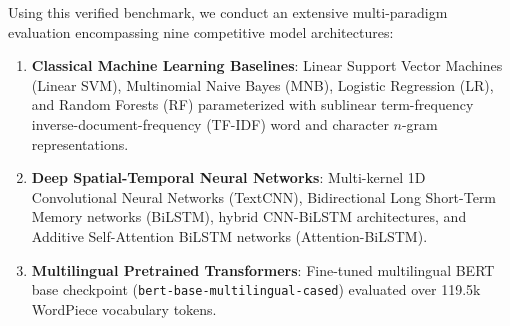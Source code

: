 \documentclass[11pt,a4paper]{article}
\begin{document}
Using this verified benchmark, we conduct an extensive multi-paradigm evaluation encompassing nine competitive model architectures:
\begin{enumerate}
    \item \textbf{Classical Machine Learning Baselines}: Linear Support Vector Machines (Linear SVM), Multinomial Naive Bayes (MNB), Logistic Regression (LR), and Random Forests (RF) parameterized with sublinear term-frequency inverse-document-frequency (TF-IDF) word and character $n$-gram representations.
    \item \textbf{Deep Spatial-Temporal Neural Networks}: Multi-kernel 1D Convolutional Neural Networks (TextCNN), Bidirectional Long Short-Term Memory networks (BiLSTM), hybrid CNN-BiLSTM architectures, and Additive Self-Attention BiLSTM networks (Attention-BiLSTM).
    \item \textbf{Multilingual Pretrained Transformers}: Fine-tuned multilingual BERT base checkpoint (\texttt{bert-base-multilingual-cased}) evaluated over 119.5k WordPiece vocabulary tokens.
\end{enumerate}
\end{document}

